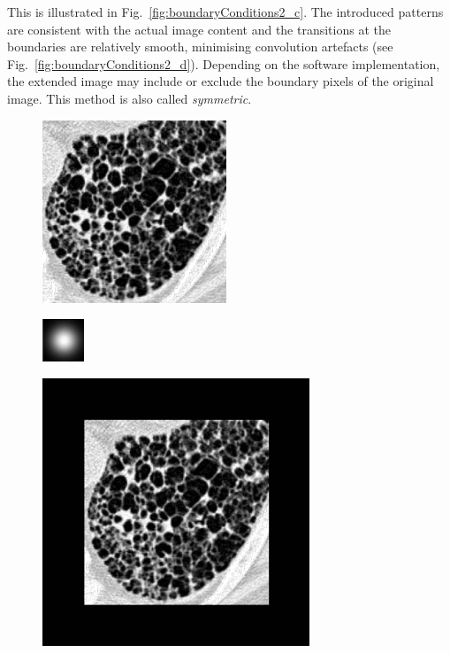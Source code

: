 \documentclass[fleqn,a4paper,oneside,openany]{book}
\begin{document}
This is illustrated in Fig.~\ref{fig:boundaryConditions2_c}.
The introduced patterns are consistent with the actual image content and the transitions at the boundaries are relatively smooth, minimising convolution artefacts (see Fig.~\ref{fig:boundaryConditions2_d}).
Depending on the software implementation, the extended image may include or exclude the boundary pixels of the original image.
This method is also called \textit{symmetric}.
%
\begin{figure}
\centering
   \begin{minipage}[b]{150pt}
     \centering
     \includegraphics[trim = 0 0 0 0, clip, scale=0.57]{originalF_BC.png}
     \label{fig:boundaryConditions1_a}
     \hspace{100pt}
   \end{minipage}
   \begin{minipage}[b]{150pt}
     \centering
     \includegraphics[trim = 0 0 0 0, clip, scale=0.57]{G_BC.png}
     \label{fig:boundaryConditions1_b}
     \hspace{100pt}
   \end{minipage}
   \begin{minipage}[b]{150pt}
     \centering
     \includegraphics[trim = 0 0 0 0, clip, scale=0.57]{ZeroPadFext_BC.png}

\end{minipage}
\end{figure}
\end{document}
